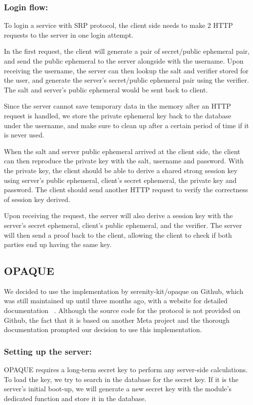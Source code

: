 \subsubsection{Login flow:}
To login a service with SRP protocol, the client side needs to make 2 HTTP requests to the server in one login attempt. 

In the first request, the client will generate a pair of secret/public ephemeral pair, and send the public ephemeral to the server alongside with the username.
Upon receiving the username, the server can then lookup the salt and verifier stored for the user, and generate the server's secret/public ephemeral pair using the verifier.
The salt and server's public ephemeral would be sent back to client.

Since the server cannot save temporary data in the memory after an HTTP request is handled, we store the private ephemeral key back to the database under the username, and make sure to clean up after a certain period of time if it is never used.

When the salt and server public ephemeral arrived at the client side, the client can then reproduce the private key with the salt, username and password.
With the private key, the client should be able to derive a shared strong session key using server's public ephemeral, client's secret ephemeral, the private key and password.
The client should send another HTTP request to verify the correctness of session key derived. 

Upon receiving the request, the server will also derive a session key with the server's secret ephemeral, client's public ephemeral, and the verifier.
The server will then send a proof back to the client, allowing the client to check if both parties end up having the same key.


\subsection{OPAQUE}
We decided to use the implementation by serenity-kit/opaque on Github, which was still maintained up until three months ago, with a website for detailed documentation ~\cite{OPAQUErepo}.
Although the source code for the protocol is not provided on Github, the fact that it is based on another Meta project and the thorough documentation prompted our decision to use this implementation.

\subsubsection{Setting up the server:}
OPAQUE requires a long-term secret key to perform any server-side calculations.
To load the key, we try to search in the database for the secret key.
If it is the server's initial boot-up, we will generate a new secret key with the module's dedicated function and store it in the database.

